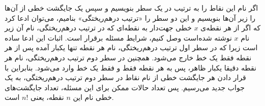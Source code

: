 \p
	اگر نام این نقاط را به ترتیب در یک سطر بنویسیم و سپس
	یک جایگشت خطی از آن‌ها را زیر آن‌ها بنویسیم و این دو سطر را «ترتیب درهم‌ریختگی» بنامیم، می‌توان
	ادعا کرد که اگر از هر نقطه‌ی
	$x$
	خطی جهت‌دار به نقطه‌ای که در ترتیب درهم‌ریختگی، نام آن
	زیر نام
	$x$
	نوشته شده‌است وصل کنیم، شرایط مسئله برقرار است.
	اثبات این ادعا ساده است زیرا که در سطر اول ترتیب درهم‌ریختگی،
	نام هر نقطه تنها یکبار آمده پس از هر نقطه فقط یک خط خارج می‌شود.
	همچنین در سطر دوم ترتیب درهم‌ریختگی، نام هر نقطه دقیقا یکبار ظاهر، پس
	به هر نقطه فقط و فقط یک خط وارد می‌شود. بنابراین با قرار دادن هر جایگشت خطی
	از نام نقاط در سطر دوم ترتیب درهم‌ریختگی، به یک جواب جدید می‌رسیم.
	پس تعداد حالات ممکن برای این مسئله، تعداد جایگشت‌های خطی نام این
	$n$
	نقطه، یعنی 
	$n!$
	است.
